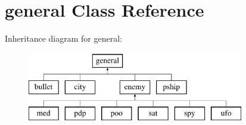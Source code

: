 \hypertarget{classgeneral}{\section{general \-Class \-Reference}
\label{classgeneral}
}
\-Inheritance diagram for general\-:\begin{figure}[H]
\begin{center}
\leavevmode
\includegraphics[height=3.000000cm]{classgeneral}
\end{center}
\end{figure}
